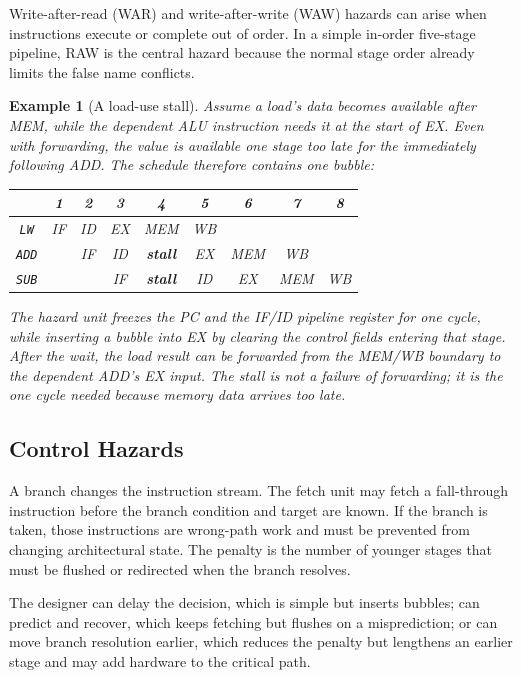 \documentclass[11pt]{article}
\newtheorem{example}{Example}[section]
\begin{document}
Write-after-read (WAR) and write-after-write (WAW) hazards can arise when
instructions execute or complete out of order. In a simple in-order
five-stage pipeline, RAW is the central hazard because the normal stage order
already limits the false name conflicts.

\begin{example}[A load-use stall]
\label{ex:load-use}
Assume a load's data becomes available after MEM, while the dependent ALU
instruction needs it at the start of EX. Even with forwarding, the value is
available one stage too late for the immediately following ADD. The schedule
therefore contains one bubble:
\begin{center}
\begin{tabular}{@{}c|cccccccc@{}}
\toprule
 & 1 & 2 & 3 & 4 & 5 & 6 & 7 & 8 \\
\midrule
\texttt{LW}  & IF & ID & EX & MEM & WB & & & \\
\texttt{ADD} & & IF & ID & \textbf{stall} & EX & MEM & WB & \\
\texttt{SUB} & & & IF & \textbf{stall} & ID & EX & MEM & WB \\
\bottomrule
\end{tabular}
\end{center}
The hazard unit freezes the PC and the IF/ID pipeline register for one cycle,
while inserting a bubble into EX by clearing the control fields entering that
stage. After the wait, the load result can be forwarded from the MEM/WB
boundary to the dependent ADD's EX input. The stall is not a failure of
forwarding; it is the one cycle needed because memory data arrives too late.
\end{example}

\subsection{Control Hazards}

A branch changes the instruction stream. The fetch unit may fetch a fall-through
instruction before the branch condition and target are known. If the branch is
taken, those instructions are wrong-path work and must be prevented from
changing architectural state. The penalty is the number of younger stages
that must be flushed or redirected when the branch resolves.

The designer can delay the decision, which is simple but inserts bubbles; can
predict and recover, which keeps fetching but flushes on a misprediction; or
can move branch resolution earlier, which reduces the penalty but lengthens an
earlier stage and may add hardware to the critical path.
\end{document}
